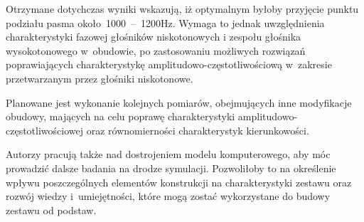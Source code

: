 \documentclass[12pt]{oska}
\newcommand{\range}[2]{\num{#1}~--~\num{#2}}
\begin{document}
		Otrzymane dotychczas wyniki wskazują, iż optymalnym byłoby przyjęcie punktu podziału pasma około~\range{1000}{1200}\si{Hz}. Wymaga to jednak uwzględnienia charakterystyki fazowej głośników niskotonowych i zespołu głośnika wysokotonowego w~obudowie, po zastosowaniu możliwych rozwiązań poprawiających charakterystykę amplitudowo-częstotliwościową w~zakresie przetwarzanym przez głośniki niskotonowe. 
	
		Planowane jest wykonanie kolejnych pomiarów, obejmujących inne modyfikacje obudowy, mających na celu poprawę charakterystyki amplitudowo-częstotliwościowej oraz równomierności charakterystyk kierunkowości. 
		
		Autorzy pracują także nad dostrojeniem modelu komputerowego, aby móc prowadzić dalsze badania na drodze symulacji. Pozwoliłoby to na określenie wpływu poszczególnych elementów konstrukcji na charakterystyki zestawu oraz rozwój wiedzy i~umiejętności, które mogą zostać wykorzystane do budowy zestawu od podstaw. 
		
\printbibliography
\end{document}
